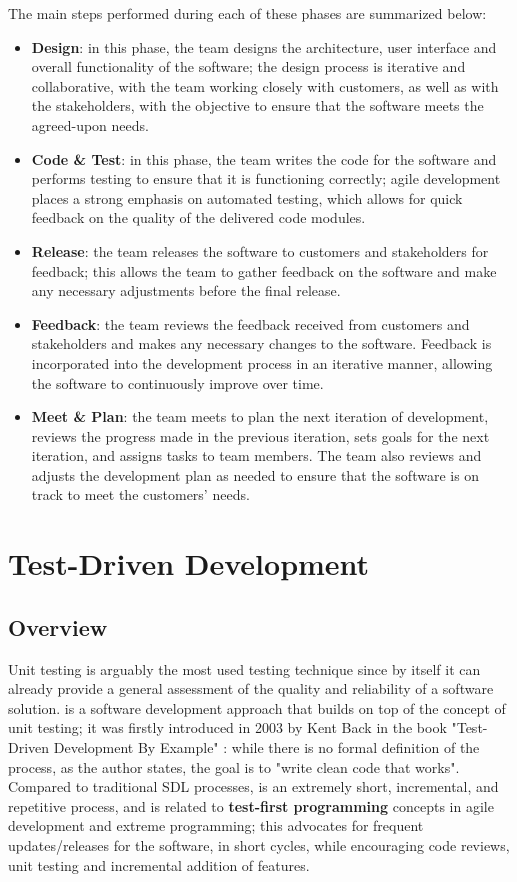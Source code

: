 \noindent The main steps performed during each of these phases are summarized below:
\begin{itemize}
    \item \textbf{Design}: in this phase, the team designs the architecture, user interface and overall functionality of the software; the design process is iterative and collaborative, with the team working closely with customers, as well as with the stakeholders, with the objective to ensure that the software meets the agreed-upon needs.
    \item \textbf{Code \& Test}: in this phase, the team writes the code for the software and performs testing to ensure that it is functioning correctly; agile development places a strong emphasis on automated testing, which allows for quick feedback on the quality of the delivered code modules.
    \item \textbf{Release}: the team releases the software to customers and stakeholders for feedback; this allows the team to gather feedback on the software and make any necessary adjustments before the final release.
    \item \textbf{Feedback}: the team reviews the feedback received from customers and stakeholders and makes any necessary changes to the software. Feedback is incorporated into the development process in an iterative manner, allowing the software to continuously improve over time.
    \item \textbf{Meet \& Plan}: the team meets to plan the next iteration of development, reviews the progress made in the previous iteration, sets goals for the next iteration, and assigns tasks to team members. The team also reviews and adjusts the development plan as needed to ensure that the software is on track to meet the customers' needs.
\end{itemize}



\section{Test-Driven Development}
\subsection{Overview}
Unit testing is arguably the most used testing technique since by itself it can already provide a general assessment of the quality and reliability of a software solution. \tdd is a software development approach that builds on top of the concept of unit testing; it was firstly introduced in 2003 by Kent Back in the book "Test-Driven Development By Example" \cite{TDDByExample}: while there is no formal definition of the process, as the author states, the goal is to "write clean code that works".
Compared to traditional SDL processes, \tdd is an extremely short, incremental, and repetitive process, and is related to \textbf{test-first programming} concepts in agile development and extreme programming; this advocates for frequent updates/releases for the software, in short cycles, while encouraging code reviews, unit testing and incremental addition of features.


